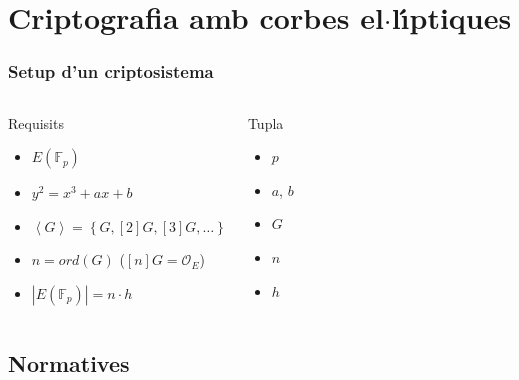 \documentclass{beamer}
\def\lgem{l\ensuremath{\cdot}l}
\def\ces{corbes e\lgem{}\'{\i}ptiques}%
\def\ecdlp{logaritme discret e\lgem{}\'{\i}ptic}%
\newcommand{\EFp}{\ensuremath{E(\mathbb{F}_p)}}%
\theoremstyle{saltolinea}   			%
\begin{document}

\section{Criptografia amb \ces}

\begin{frame}
  \frametitle{Setup d'un criptosistema}
  \begin{columns}[H]
      \begin{block}{Requisits}
        \begin{itemize}
          \item<2-> \EFp
          \item<2-> $y^2=x^3+ax+b$
          \item<4-> $\left\langle G\right\rangle = \left\{ G,[2]G,[3]G,\ldots\right\}$
          \item<6-> $n = ord(G)$ ($[n]G=\mathcal{O}_{E}$)
          \item<8-> $|\EFp| = n \cdot h$
        \end{itemize}
      \end{block}
      \begin{block}{Tupla}
        \begin{itemize}
          \item<3-> $p$
          \item<3-> $a$, $b$
          \item<5-> $G$
          \item<7-> $n$
          \item<9-> $h$
        \end{itemize}
      \end{block}
  \end{columns}
\end{frame}

\subsection{Normatives}
\end{document}
